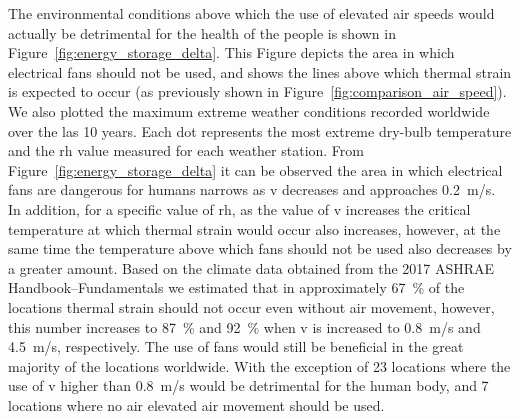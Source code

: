 The environmental conditions above which the use of elevated air speeds would actually be detrimental for the health of the people is shown in Figure~\ref{fig:energy_storage_delta}.
This Figure depicts the area in which electrical fans should not be used, and shows the lines above which thermal strain is expected to occur (as previously shown in Figure~\ref{fig:comparison_air_speed}).
We also plotted the maximum extreme weather conditions recorded worldwide over the las 10 years.
Each dot represents the most extreme dry-bulb temperature and the \ac{rh} value measured for each weather station.
From Figure~\ref{fig:energy_storage_delta} it can be observed the area in which electrical fans are dangerous for humans narrows as \ac{v} decreases and approaches 0.2~m/s.
In addition, for a specific value of \ac{rh}, as the value of \ac{v} increases the critical temperature at which thermal strain would occur also increases, however, at the same time the temperature above which fans should not be used also decreases by a greater amount.
Based on the climate data obtained from the 2017 ASHRAE Handbook--Fundamentals we estimated that in approximately 67~\% of the locations thermal strain should not occur even without air movement, however, this number increases to 87~\% and 92~\% when \ac{v} is increased to 0.8~m/s and 4.5~m/s, respectively.
The use of fans would still be beneficial in the great majority of the locations worldwide.
With the exception of 23 locations where the use of \ac{v} higher than 0.8~m/s would be detrimental for the human body, and 7 locations where no air elevated air movement should be used.



